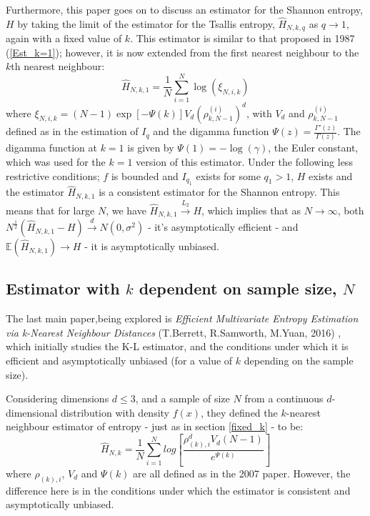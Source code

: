 \documentclass[12pt]{report}
\begin{document}
Furthermore, this paper goes on to discuss an estimator for the Shannon entropy, $H$ by taking the limit of the estimator for the Tsallis entropy, $\hat{H}_{N, k, q}$ as $q \to 1$, again with a fixed value of $k$. This estimator is similar to that proposed in 1987 (\ref{Est_k=1}); however, it is now extended from the first nearest neighbour to the $k$th nearest neighbour:
\begin{equation}
\hat{H}_{N, k, 1} =  \frac{1}{N} \sum_{i=1}^{N} \log (\xi_{N, i, k})
\end{equation} 
where $\xi_{N, i, k} = (N-1)\exp[-\Psi(k)]V_{d}(\rho_{k, N-1}^{(i)})^{d}$, with $V_{d}$ and $\rho_{k, N-1}^{(i)}$ defined as in the estimation of $I_{q}$ and the digamma function $\Psi(z) = \frac{\Gamma'(z)}{\Gamma(z)}$. The digamma function at $k=1$ is given by $\Psi(1) = -\log(\gamma)$, the Euler constant, which was used for the $k=1$ version of this estimator. Under the following less restrictive conditions; $f$ is bounded and $I_{q_{1}}$ exists for some $q_{1} > 1$, $H$ exists and the estimator $\hat{H}_{N, k, 1}$ is a consistent estimator for the Shannon entropy. This means that for large $N$, we have $\hat{H}_{N, k, 1} \overset{L_{2}}{\to} H$, which implies that as $N \to \infty$, both $N^{\frac{1}{2}}(\hat{H}_{N, k, 1} - H) \overset{d}{\to} N(0, \sigma^2)$ - it's asymptotically efficient - and $\mathbb{E}(\hat{H}_{N, k, 1}) \to H$ - it is asymptotically unbiased.



\subsection{Estimator with $k$ dependent on sample size, $N$} \label{dependent_k}

The last main paper,being explored is \textit{Efficient Multivariate Entropy Estimation via k-Nearest Neighbour Distances} (T.Berrett, R.Samworth, M.Yuan, 2016) \cite{paper4}, which initially studies the K-L estimator, and the conditions under which it is efficient and asymptotically unbiased (for a value of $k$ depending on the sample size). 

Considering dimensions $d \leq 3$, and a sample of size $N$ from a continuous $d$-dimensional distribution with density $f(x)$, they defined the $k$-nearest neighbour estimator of entropy - just as in section \ref{fixed_k} - to be:
\begin{equation}
\hat{H}_{N, k} = \frac{1}{N} \sum_{i=1}^{N} log \left[ \frac{\rho_{(k),i}^{d} V_{d} (N-1)}{e^{\Psi(k)}} \right]
\end{equation}
where $\rho_{(k),i}$, $V_{d}$ and $\Psi(k)$ are all defined as in the 2007 paper. However, the difference here is in the conditions under which the estimator is consistent and asymptotically unbiased.
\end{document}

